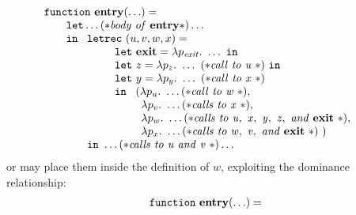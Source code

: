 \begin{description}
    \begin{equation}
      \label{FunctionalSreedharGaoLee2}
      \begin{array}{l}
        \mathtt{function}\ \entrynode (\ldots)=\\
        \qquad \mathtt{let} \ldots (* \mathit{body\ of\ \entrynode}*)\ldots\\ 
        \qquad \mathtt{in}\
        \begin{array}[t]{l}
          \mathtt{letrec}\ (u,v,w,x) =\\
          \qquad
          \begin{array}[t]{l}
            \mathtt{let}\ \exitnode = \lambda p_{\mathit{exit}}.\ \ldots\
            \mathtt{in}\\
            \mathtt{let}\ z = \lambda p_z.\ \ldots\ (*\mathit{call\ to\ u}\ *)\
            \mathtt{in}\\
            \mathtt{let}\ y = \lambda p_y.\ \ldots\ (*\mathit{call\ to\ x}\ *)\\
            \mathtt{in}\ 
            \begin{array}[t]{l}
              (%
              \lambda p_u.\ \ldots
              (*\mathit{call\ to\ w}\ *),\\
              \ \, \lambda p_v.\ \ldots
              (*\mathit{calls\ to\ x}\ *),\\
              \ \, \lambda p_w.\ \ldots
              (*\mathit{calls\ to\ u,\ x,\ y,\ z,\ and\ \exitnode}\ *),\\
              \ \, \lambda p_x.\ \ldots
              (*\mathit{calls\ to\ w,\ v,\ and\ \exitnode}\ *)\ )
            \end{array}\\
          \end{array}\\
          \mathtt{in}\ \ldots (*\mathit{calls\ to\ u\ and\ v}\ *) \ldots
        \end{array}
      \end{array}
    \end{equation} 
    or may place them inside the definition of $w$, exploiting the
    dominance relationship:
    \begin{equation}
      \label{FunctionalSreedharGaoLee3}
      \begin{array}{l}
        \mathtt{function}\ \mathbf{entry} (\ldots)=\\

\end{array}
\end{equation}
\end{description}
